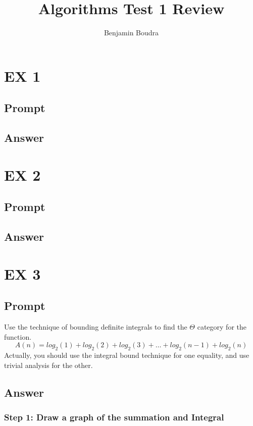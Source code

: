 \documentclass[10pt,a4paper]{article}
\title{Algorithms Test 1 Review}
\author{Benjamin Boudra}
\theoremstyle{definition}
\begin{document}
\maketitle
\tableofcontents
\section{EX 1}
\subsection{Prompt}
\subsection{Answer}

\section{EX 2}
\subsection{Prompt}
\subsection{Answer}

\section{EX 3}
\subsection{Prompt}
Use the technique of bounding definite integrals to find the $\Theta$ category for the function.
\begin{equation}
  A (n) = log_2(1) + log_2(2) + log_2(3) + \ldots + log_2(n-1) + log_2(n)
\end{equation}
Actually, you should use the integral bound technique for one equality, and use trivial analysis for the other.
\subsection{Answer}
\subsubsection{Step 1: Draw a graph of the summation and Integral}
\end{document}
